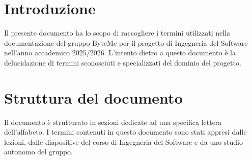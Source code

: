 \documentclass[11pt,a4paper]{article}
\begin{document}
\newpage

\tableofcontents
\thispagestyle{empty}
\newpage
\setcounter{page}{1}

\section{Introduzione}
Il presente documento ha lo scopo di raccogliere i termini utilizzati nella documentazione del gruppo ByteMe per il progetto di Ingegneria del Software nell'anno accademico 2025/2026.
L'intento dietro a questo documento è la delucidazione di termini sconosciuti e specializzati del dominio del progetto.

\section{Struttura del documento}
Il documento è strutturato in sezioni dedicate ad una specifica lettera dell'alfabeto. I termini contenuti in questo documento sono stati appresi dalle lezioni, dalle diapositive del corso di Ingegneria del Software e da uno studio autonomo del gruppo.
\newpage
\end{document}
